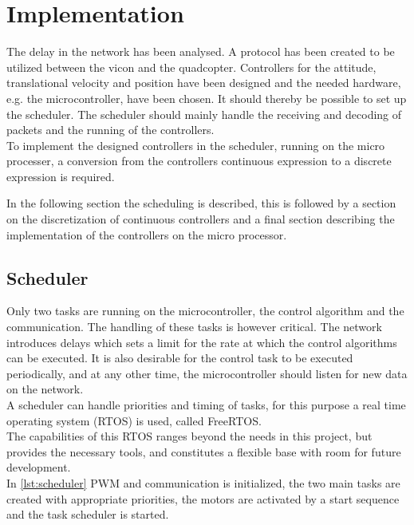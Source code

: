 \chapter{Implementation}
The delay in the network has been analysed. A protocol has been created to be utilized between the vicon and the quadcopter. Controllers for the attitude, translational velocity and position have been designed and the needed hardware, e.g. the microcontroller, have been chosen. It should thereby be possible to set up the scheduler. The scheduler should mainly handle the receiving and decoding of packets and the running of the controllers. \\ To implement the designed controllers in the scheduler, running on the micro processer, a conversion from the controllers continuous expression to a discrete expression is required.

In the following section the scheduling is described, this is followed by a section on the discretization of continuous controllers and a final section describing the implementation of the controllers on the micro processor.

\section{Scheduler}
Only two tasks are running on the microcontroller, the control algorithm and the communication. The handling of these tasks is however critical. The network introduces delays which sets a limit for the rate at which the control algorithms can be executed. It is also desirable for the control task to be executed periodically, and at any other time, the microcontroller should listen for new data on the network.\\
A scheduler can handle priorities and timing of tasks, for this purpose a real time operating system (RTOS) is used, called FreeRTOS.\\
The capabilities of this RTOS ranges beyond the needs in this project, but provides the necessary tools, and constitutes a flexible base with room for future development.\\
In \autoref{lst:scheduler} PWM and communication is initialized, the two main tasks are created with appropriate priorities, the motors are activated by a start sequence and the task scheduler is started.\\

